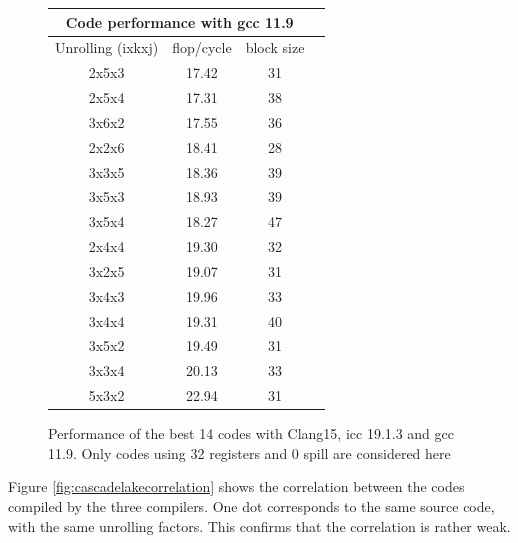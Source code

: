 \documentclass[sigconf,review]{acmart}
\begin{document}
\begin{figure}[ht]
{\begin{tabular}{|c|c|c|c|}
      \hline
      \multicolumn{3}{|c|}{Code performance with gcc 11.9} \\
      \hline
      Unrolling (ixkxj) & flop/cycle  & block size \\
      \hline
2x5x3 & 17.42  & 31\\
2x5x4 & 17.31  & 38\\
3x6x2 & 17.55  & 36\\
2x2x6 & 18.41  & 28\\
3x3x5 & 18.36  & 39\\
3x5x3 & 18.93  & 39\\
3x5x4 & 18.27  & 47\\
2x4x4 & 19.30  & 32\\
3x2x5 & 19.07  & 31\\
3x4x3 & 19.96  & 33\\
3x4x4 & 19.31  & 40\\
3x5x2 & 19.49  & 31\\
3x3x4 & 20.13  & 33\\
5x3x2 & 22.94  & 31\\
\hline
    \end{tabular}
}
\caption{Performance of the best 14 codes with Clang15,  icc 19.1.3 and gcc 11.9. Only codes using 32 registers and 0 spill are considered here\label{fig:tables}}
\end{figure}

Figure \ref{fig:cascadelakecorrelation}  shows the correlation between the codes compiled by the three compilers. One dot corresponds to the same source code, with the same unrolling factors. This confirms that the correlation is rather weak. 
\end{document}
